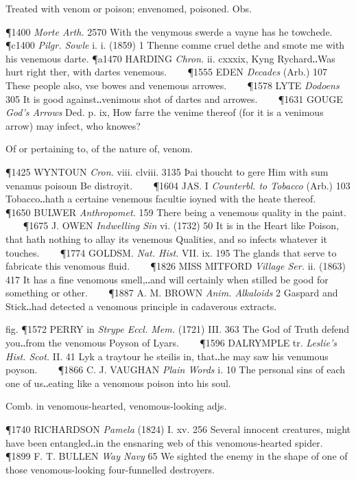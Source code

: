\begin{description}[wide, labelwidth=!, labelindent=0pt]
\begin{myenumerate}
 Treated with venom or poison; envenomed, poisoned. Obs.

\P 1400  \textit{Morte Arth.} 2570 With the venymous swerde a vayne has he towchede.
\P c1400 \textit{Pilgr.  Sowle} i. i. (1859) 1 Thenne comme cruel dethe and smote me with his venemous darte.
\P a1470 HARDING  \textit{Chron.} ii. cxxxix, Kyng Rychard‥Was hurt right ther, with dartes venemous.    
\P 1555 EDEN  \textit{Decades} (Arb.) 107 These people also, vse bowes and venemous arrowes.    
\P 1578 LYTE  \textit{Dodoens} 305 It is good against‥venimous shot of dartes and arrowes.    
\P 1631 GOUGE  \textit{God's Arrows} Ded. p. ix, How farre the venime thereof (for it is a venimous arrow) may infect, who knowes?

 Of or pertaining to, of the nature of, venom.

\P 1425 WYNTOUN  \textit{Cron.} viii. clviii. 3135 Þai thoucht to gere Him with sum venamus poisoun Be distroyit.    
\P 1604 JAS. I  \textit{Counterbl. to Tobacco} (Arb.) 103 Tobacco‥hath a certaine venemous facultie ioyned with the heate thereof.    
\P 1650 BULWER  \textit{Anthropomet.} 159 There being a venemous quality in the paint.    
\P 1675 J. OWEN  \textit{Indwelling Sin} vi. (1732) 50 It is in the Heart like Poison, that hath nothing to allay its venemous Qualities, and so infects whatever it touches.    
\P 1774 GOLDSM.  \textit{Nat. Hist.} VII. ix. 195 The glands that serve to fabricate this venomous fluid.    
\P 1826 MISS MITFORD  \textit{Village Ser.} ii. (1863) 417 It has a fine venomous smell,‥and will certainly when stilled be good for something or other.    
\P 1887 A. M. BROWN  \textit{Anim. Alkaloids} 2 Gaspard and Stick‥had detected a venomous principle in cadaverous extracts.

fig. \P 1572 PERRY in  \textit{Strype Eccl. Mem.} (1721) III. 363 The God of Truth defend you‥from the venomous Poyson of Lyars.    
\P 1596 DALRYMPLE tr.  \textit{Leslie's Hist. Scot.} II. 41 Lyk a traytour he steilis in, that‥he may saw his venumous poyson.    
\P 1866 C. J. VAUGHAN  \textit{Plain Words} i. 10 The personal sins of each one of us‥eating like a venomous poison into his soul.

 Comb. in venomous-hearted, venomous-looking adjs.

\P 1740 RICHARDSON  \textit{Pamela} (1824) I. xv. 256 Several innocent creatures, might have been entangled‥in the ensnaring web of this venomous-hearted spider.    
\P 1899 F. T. BULLEN  \textit{Way Navy} 65 We sighted the enemy in the shape of one of those venomous-looking four-funnelled destroyers.
\end{myenumerate}



\end{description}
